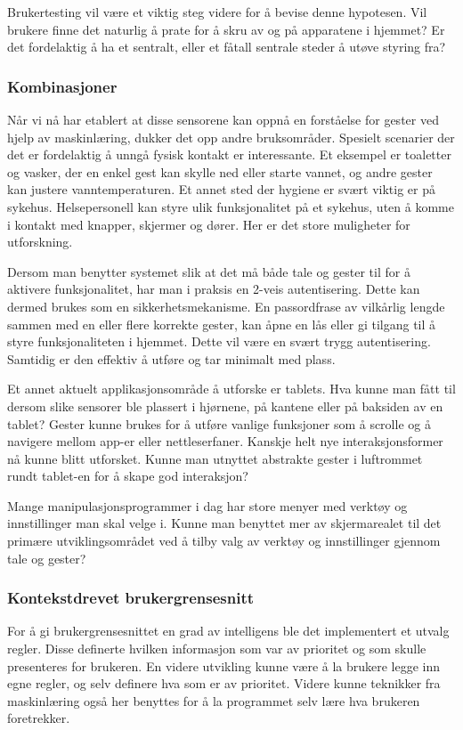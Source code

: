 Brukertesting vil være et viktig steg videre for å bevise denne hypotesen. Vil brukere finne det naturlig å prate for å skru av og på apparatene i hjemmet? Er det fordelaktig å ha et sentralt, eller et fåtall sentrale steder å utøve styring fra?\\

\subsubsection*{Kombinasjoner}
Når vi nå har etablert at disse sensorene kan oppnå en forståelse for gester ved hjelp av maskinlæring, dukker det opp andre bruksområder. Spesielt scenarier der det er fordelaktig å unngå fysisk kontakt er interessante. Et eksempel er toaletter og vasker, der en enkel gest kan skylle ned eller starte vannet, og andre gester kan justere vanntemperaturen. Et annet sted der hygiene er svært viktig er på sykehus. Helsepersonell kan styre ulik funksjonalitet på et sykehus, uten å komme i kontakt med knapper, skjermer og dører. Her er det store muligheter for utforskning.

Dersom man benytter systemet slik at det må både tale og gester til for å aktivere funksjonalitet, har man i praksis en 2-veis autentisering. Dette kan dermed brukes som en sikkerhetsmekanisme. En passordfrase av vilkårlig lengde sammen med en eller flere korrekte gester, kan åpne en lås eller gi tilgang til å styre funksjonaliteten i hjemmet. Dette vil være en svært trygg autentisering. Samtidig er den effektiv å utføre og tar minimalt med plass.

Et annet aktuelt applikasjonsområde å utforske er tablets. Hva kunne man fått til dersom slike sensorer ble plassert i hjørnene, på kantene eller på baksiden av en tablet? Gester kunne brukes for å utføre vanlige funksjoner som å scrolle og å navigere mellom app-er eller nettleserfaner. Kanskje helt nye interaksjonsformer nå kunne blitt utforsket. Kunne man utnyttet abstrakte gester i luftrommet rundt tablet-en for å skape god interaksjon?

Mange manipulasjonsprogrammer i dag har store menyer med verktøy og innstillinger man skal velge i. Kunne man benyttet mer av skjermarealet til det primære utviklingsområdet ved å tilby valg av verktøy og innstillinger gjennom tale og gester?\\

\subsubsection*{Kontekstdrevet brukergrensesnitt}
For å gi brukergrensesnittet en grad av intelligens ble det implementert et utvalg regler. Disse definerte hvilken informasjon som var av prioritet og som skulle presenteres for brukeren. En videre utvikling kunne være å la brukere legge inn egne regler, og selv definere hva som er av prioritet. Videre kunne teknikker fra maskinlæring også her benyttes for å la programmet selv lære hva brukeren foretrekker. 

